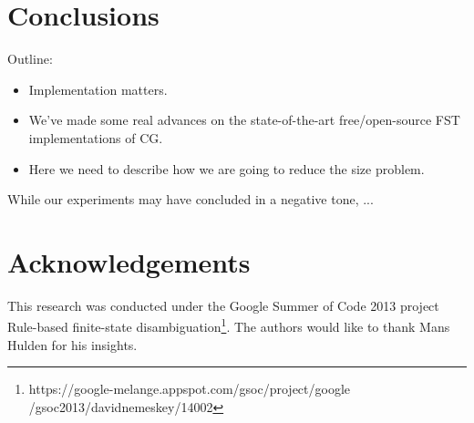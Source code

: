 \documentclass{article}
\begin{document}
\section{Conclusions}
\label{sec:conclusion}
Outline:
\begin{itemize}
\item Implementation matters.
\item We've made some real advances on the state-of-the-art free/open-source
  FST implementations of CG. 
\item Here we need to describe how we are going to reduce the size problem.
\end{itemize}
While our experiments may have concluded in a negative tone, ...

\section*{Acknowledgements}
This research was conducted under the Google Summer of Code 2013 project
Rule-based finite-state disambiguation\footnote{https://google-melange.appspot.com/gsoc/project/google
/gsoc2013/davidnemeskey/14002}. The authors would like to thank Mans Hulden for
his insights.

\cite{Karlsson:1990} %
\cite{Hulden:2011} %
\cite{Peltonen:2011} %
\cite{Tapanainen:1996} %



\end{document}
